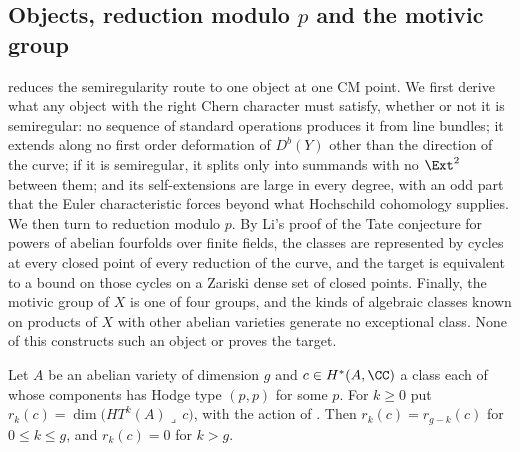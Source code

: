 \subsection{Objects, reduction modulo $p$ and the motivic group}
\label{ssec:mumfordobject}

 reduces the semiregularity route to one object at
one CM point. We first derive what any object with the right Chern character
must satisfy, whether or not it is semiregular: no sequence of standard
operations produces it from line bundles; it extends along no first order
deformation of $D^{b}(Y)$ other than the direction of the curve; if it is
semiregular, it splits only into summands with no $\Ext^{2}$ between them;
and its self-extensions are large in every degree, with an odd part that the
Euler characteristic forces beyond what Hochschild cohomology supplies. We
then turn to reduction modulo $p$. By Li's proof of the Tate conjecture for
powers of abelian fourfolds over finite fields, the classes are represented
by cycles at every closed point of every reduction of the curve, and the
target is equivalent to a bound on those cycles on a Zariski dense set of
closed points. Finally, the motivic group of $X$ is one of four groups, and
the kinds of algebraic classes known on products of $X$ with other abelian
varieties generate no exceptional class. None of this constructs such an
object or proves the target.

\begin{lemma}\label{lem:rankduality}
Let $A$ be an abelian variety of dimension $g$ and $c\in H^{*}(A,\CC)$ a class
each of whose components has Hodge type $(p,p)$ for some $p$. For $k\ge0$ put
$r_{k}(c)=\dim\bigl(HT^{k}(A)\lrcorner\,c\bigr)$, with the action of
\cite[Setup~2.7]{paperII}. Then $r_{k}(c)=r_{g-k}(c)$ for $0\le k\le g$, and
$r_{k}(c)=0$ for $k>g$.
\end{lemma}

